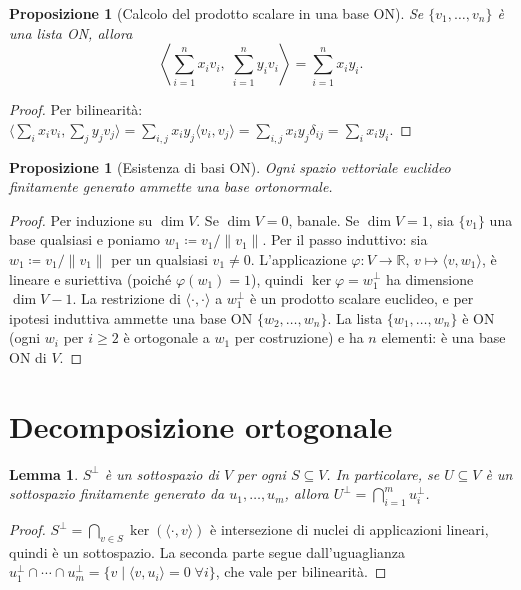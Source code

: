 \documentclass[11pt, a4paper]{book}
\theoremstyle{definition}
\theoremstyle{plain}
\newtheorem{proposizione}[definizione]{Proposizione}
\newtheorem{lemma}[definizione]{Lemma}
\theoremstyle{remark}
\newcommand{\R}{\mathbb{R}}
\begin{document}
\begin{proposizione}[Calcolo del prodotto scalare in una base ON]
\label{prop:calcolo-ON}
Se $\{v_1,\ldots,v_n\}$ è una lista ON, allora
\[
  \left\langle\sum_{i=1}^n x_i v_i,\; \sum_{i=1}^n y_i v_i\right\rangle = \sum_{i=1}^n x_i y_i.
\]
\end{proposizione}

\begin{proof}
Per bilinearità: $\langle \sum_i x_i v_i, \sum_j y_j v_j\rangle = \sum_{i,j} x_i y_j \langle v_i,v_j\rangle = \sum_{i,j} x_i y_j \delta_{ij} = \sum_i x_i y_i$.
\end{proof}

\begin{proposizione}[Esistenza di basi ON]
\label{prop:esistenza-base-ON}
Ogni spazio vettoriale euclideo finitamente generato ammette una base ortonormale.
\end{proposizione}

\begin{proof}
Per induzione su $\dim V$. Se $\dim V = 0$, banale. Se $\dim V = 1$, sia $\{v_1\}$ una base qualsiasi e poniamo $w_1 \coloneqq v_1/\|v_1\|$. Per il passo induttivo: sia $w_1 \coloneqq v_1/\|v_1\|$ per un qualsiasi $v_1 \neq 0$. L'applicazione $\varphi \colon V \to \R$, $v \mapsto \langle v,w_1\rangle$, è lineare e suriettiva (poiché $\varphi(w_1)=1$), quindi $\ker\varphi = w_1^\perp$ ha dimensione $\dim V - 1$. La restrizione di $\langle\cdot,\cdot\rangle$ a $w_1^\perp$ è un prodotto scalare euclideo, e per ipotesi induttiva ammette una base ON $\{w_2,\ldots,w_n\}$. La lista $\{w_1,\ldots,w_n\}$ è ON (ogni $w_i$ per $i\geq 2$ è ortogonale a $w_1$ per costruzione) e ha $n$ elementi: è una base ON di $V$.
\end{proof}

\section{Decomposizione ortogonale}
\label{sec:decomp-ortogonale}

\begin{lemma}
$S^\perp$ è un sottospazio di $V$ per ogni $S \subseteq V$. In particolare, se $U \subseteq V$ è un sottospazio finitamente generato da $u_1,\ldots,u_m$, allora $U^\perp = \bigcap_{i=1}^m u_i^\perp$.
\end{lemma}

\begin{proof}
$S^\perp = \bigcap_{v \in S}\ker(\langle\cdot,v\rangle)$ è intersezione di nuclei di applicazioni lineari, quindi è un sottospazio. La seconda parte segue dall'uguaglianza $u^\perp_1 \cap \cdots \cap u^\perp_m = \{v \mid \langle v,u_i\rangle = 0\;\forall i\}$, che vale per bilinearità.
\end{proof}
\end{document}
